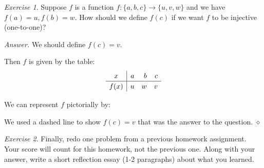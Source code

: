 \documentclass[12pt,oneside]{amsart}
\theoremstyle{remark}
\newtheorem{exer}{Exercise}
\newenvironment{answer}{\bigskip\noindent\emph{Answer.}}{\hfill$\diamond$\newline}
\begin{document}

\newpage
\begin{exer}
Suppose $f$ is a function $f: \{a, b, c\} \to \{u, v, w\}$  and we have $f(a) = u, f(b) = w$. How should we define $f(c)$ if we want $f$ to be injective (one-to-one)?
\end{exer}

\begin{answer}
We should define $f(c) = v$.

Then $f$ is given by the table:
\[
\linespread{1.2}\selectfont %
\begin{array}{c|rrr}
x & a & b & c \\
\hline
f(x) & u & w & v \\
\end{array}
\]

We can represent $f$ pictorially by:
\begin{center}
\end{center}
We used a dashed line to show $f(c)=v$ that was the answer to the question.
\end{answer}

\newpage
\begin{exer}
Finally, redo one problem from a previous homework assignment. Your score will count for this homework, not the previous one. Along with your answer, write a short reflection essay (1-2 paragraphs) about what you learned.
\end{exer}
\end{document}

